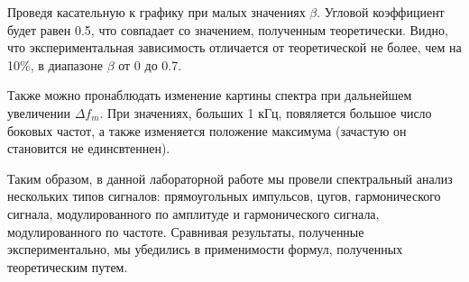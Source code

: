 \documentclass[14pt]{article}
\begin{document}
\vspace{1cm}

\vspace{1cm}
Проведя касательную к графику при малых значениях $\beta$. Угловой коэффициент будет равен 0.5, что совпадает со значением, полученным теоретически. Видно, что экспериментальная зависимость отличается от теоретической не более, чем на 10\%, в диапазоне $\beta$ от 0 до 0.7. 

\vspace{1cm}
Также можно пронаблюдать изменение картины спектра при дальнейшем увеличении $\Delta f_m$. При значениях, больших 1 кГц, повяляется большое число боковых частот, а также изменяется положение максимума (зачастую он становится не единсвтеннен).

\newpage
Таким образом, в данной лабораторной работе мы провели спектральный анализ нескольких типов сигналов: прямоугольных импульсов, цугов, гармонического сигнала, модулированного по амплитуде и гармонического сигнала, модулированного по частоте. Сравнивая результаты, полученные экспериментально, мы убедились в применимости формул, полученных теоретическим путем. 
\end{document}
